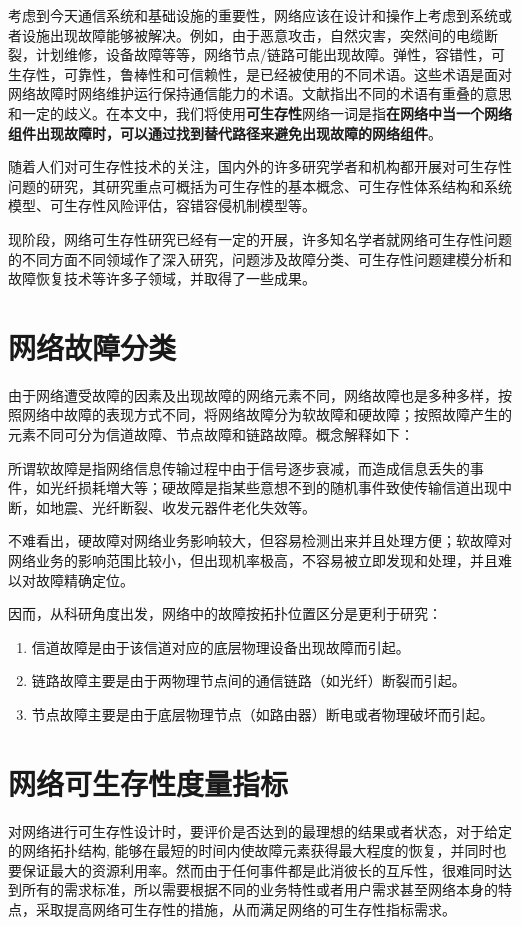 考虑到今天通信系统和基础设施的重要性，网络应该在设计和操作上考虑到系统或者设施出现故障能够被解决。例如，由于恶意攻击，自然灾害，突然间的电缆断裂，计划维修，设备故障等等，网络节点/链路可能出现故障。弹性，容错性，可生存性，可靠性，鲁棒性和可信赖性，是已经被使用的不同术语。这些术语是面对网络故障时网络维护运行保持通信能力的术语。文献指出不同的术语有重叠的意思和一定的歧义。在本文中，我们将使用\textbf{可生存性}网络一词是指\textbf{在网络中当一个网络组件出现故障时，可以通过找到替代路径来避免出现故障的网络组件}。


随着人们对可生存性技术的关注，国内外的许多研究学者和机构都开展对可生存性问题的研究，其研究重点可概括为可生存性的基本概念\cite{kuipers2012overview}、可生存性体系结构和系统模型\cite{luxinhua2006}、可生存性风险评估\cite{linxuegang2006}，容错容侵机制模型\cite{linchuang2005}等。

现阶段，网络可生存性研究已经有一定的开展，许多知名学者就网络可生存性问题的不同方面不同领域作了深入研究，问题涉及故障分类、可生存性问题建模分析和故障恢复技术等许多子领域，并取得了一些成果。

\section{网络故障分类}
由于网络遭受故障的因素及出现故障的网络元素不同，网络故障也是多种多样，按照网络中故障的表现方式不同，将网络故障分为软故障和硬故障\cite{sebos2001auto}；按照故障产生的元素不同可分为信道故障、节点故障和链路故障。概念解释如下：

所谓软故障是指网络信息传输过程中由于信号逐步衰减，而造成信息丢失的事 件，如光纤损耗増大等；硬故障是指某些意想不到的随机事件致使传输信道出现中断，如地震、光纤断裂、收发元器件老化失效等。

不难看出，硬故障对网络业务影响较大，但容易检测出来并且处理方便；软故障对网络业务的影响范围比较小，但出现机率极高，不容易被立即发现和处理，并且难以对故障精确定位。

因而，从科研角度出发，网络中的故障按拓扑位置区分是更利于研究：
\begin{enumerate}
\item 信道故障是由于该信道对应的底层物理设备出现故障而引起。
\item 链路故障主要是由于两物理节点间的通信链路（如光纤）断裂而引起。
\item 节点故障主要是由于底层物理节点（如路由器）断电或者物理破坏而引起。
\end{enumerate}



\section{网络可生存性度量指标}
对网络进行可生存性设计时，要评价是否达到的最理想的结果或者状态，对于给定的网络拓扑结构, 能够在最短的时间内使故障元素获得最大程度的恢复，并同时也要保证最大的资源利用率\cite{wangxiujun2008}。然而由于任何事件都是此消彼长的互斥性，很难同时达到所有的需求标准，所以需要根据不同的业务特性或者用户需求甚至网络本身的特点，采取提高网络可生存性的措施，从而满足网络的可生存性指标需求。

